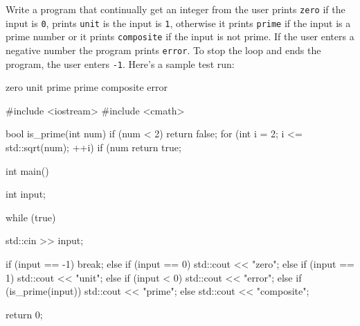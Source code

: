 

\nextq
Write a program that continually get an integer from the
user prints \verb!zero! if the input is \verb!0!,
prints \verb!unit! is the input is \verb!1!,
otherwise it prints \verb!prime! if the input is a prime number
or it prints \verb!composite! if the input is not prime.
If the user enters a negative number the program prints \verb!error!.
To stop the loop and ends the program, the user enters \verb!-1!.
Here's a sample test run:
\begin{console}[commandchars=\\\{\},fontsize=\footnotesize]
zero
unit
prime
prime
composite
error
\end{console}
\ANSWER
\begin{answercode}
#include <iostream>
#include <cmath>

bool is_prime(int num)
{
    if (num < 2) return false;          
    for (int i = 2; i <= std::sqrt(num); ++i)
    {
        if (num %
    }
    return true; 
}

int main()
{
    int input;

    while (true)
    {
        std::cin >> input; 

        if (input == -1)
        {              
            break;
        }
        else if (input == 0)
        {
            std::cout << "zero\n";
        }
        else if (input == 1)
        {
            std::cout << "unit\n";
        }
        else if (input < 0)
        {
            std::cout << "error\n";
        }
        else if (is_prime(input))
        {
            std::cout << "prime\n";
        }
        else
        {
            std::cout << "composite\n";
        }
    }

    return 0;
}
\end{answercode}


